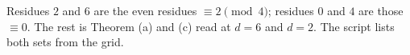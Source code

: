 Residues $2$ and $6$ are the even residues $\equiv 2 \pmod 4$; residues $0$ and $4$ are those $\equiv 0$. The rest is Theorem (a) and (c) read at $d = 6$ and $d = 2$. The script lists both sets from the grid.
